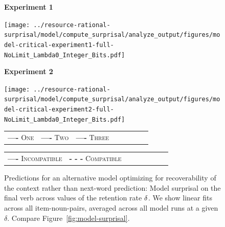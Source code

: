 \begin{figure}
    \centering

	\textbf{Experiment 1}
    

		\texttt{[image: ../resource-rational-surprisal/model/compute\_surprisal/analyze\_output/figures/model-critical-experiment1-full-NoLimit\_Lambda0\_Integer\_Bits.pdf]} %

	\textbf{Experiment 2}


    \texttt{[image: ../resource-rational-surprisal/model/compute\_surprisal/analyze\_output/figures/model-critical-experiment2-full-NoLimit\_Lambda0\_Integer\_Bits.pdf]}


        \begin{tabular}{llllllll}
\textbf{\textcolor{one}{----}} \textsc{One}&
\textbf{\textcolor{two}{----}} \textsc{Two}&
\textbf{\textcolor{three}{----}} \textsc{Three}
\end{tabular}
    
    \begin{tabular}{llllllll}
\textbf{{----}} \textsc{Incompatible}&
\textbf{{- - -}} \textsc{Compatible}
\end{tabular}
    
    
    
   
    \caption{Predictions for an alternative  model optimizing for recoverability of the context rather than next-word prediction: Model surprisal on the final verb across values of the retention rate $\delta$. We show linear fits across all item-noun-pairs, averaged across all model runs at a given $\delta$.
	Compare Figure~\ref{fig:model-surprisal}.
	}
    \label{fig:model-surprisal-recovery}
\end{figure}


 


